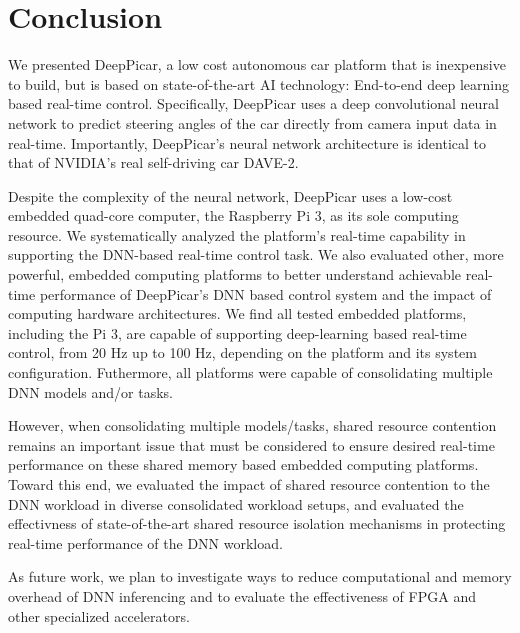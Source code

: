 \section{Conclusion}\label{sec:conclusion}
We presented DeepPicar, a low cost autonomous car platform that is
inexpensive to build, but is based on state-of-the-art AI technology:
End-to-end deep learning based real-time control.
Specifically, DeepPicar uses a deep convolutional neural network to
predict steering angles of the car directly from camera input data
in real-time. Importantly, DeepPicar's neural network architecture is
identical to that of NVIDIA's real self-driving car DAVE-2. 

Despite the complexity of the neural network, DeepPicar uses a
low-cost embedded quad-core computer, the Raspberry Pi 3,  as its sole
computing resource.
We systematically analyzed the platform's real-time capability in
supporting the DNN-based real-time control task.
We also evaluated other, more powerful, embedded computing
platforms to better understand achievable real-time performance of
DeepPicar's DNN based control system and the impact of
computing hardware architectures.
We find all tested embedded platforms, including the Pi 3, are capable
of supporting deep-learning based real-time control, from 20 Hz up to
100 Hz, depending on the platform and its system
configuration. Futhermore, all platforms were capable of consolidating
multiple DNN models and/or tasks.

However, when consolidating multiple models/tasks, shared resource
contention remains an important issue that must be considered to
ensure desired real-time performance on these shared memory based
embedded computing platforms. 
Toward this end, we evaluated the impact of shared resource contention
to the DNN workload in diverse consolidated workload setups, and
evaluated the effectivness of state-of-the-art shared resource
isolation mechanisms in protecting real-time performance of the DNN
workload.

As future work, we plan to investigate ways to reduce computational
and memory overhead of DNN inferencing and to evaluate the
effectiveness of FPGA and other specialized accelerators.


